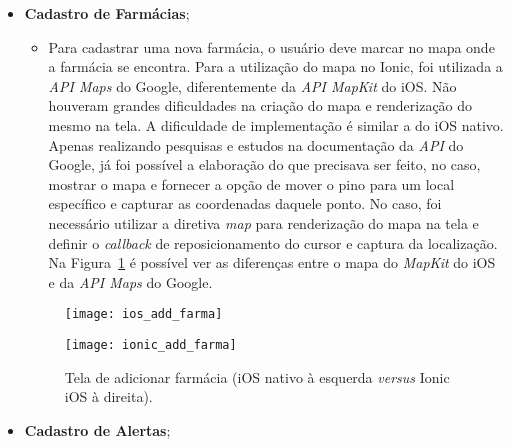 \begin{itemize}
\begin{itemize}
		 \end{itemize}
     \item \textbf{Cadastro de Farmácias}; 	
	 \begin{itemize}
		\item Para cadastrar uma nova farmácia, o usuário deve marcar no mapa onde a farmácia se encontra. Para a utilização do mapa no Ionic, foi utilizada a \textit{API Maps} do Google, diferentemente da 
		\textit{API MapKit} do iOS. Não houveram grandes dificuldades na criação do mapa e renderização do mesmo na tela. A dificuldade de implementação é similar a do iOS nativo.
		Apenas realizando pesquisas e estudos na documentação da \textit{API} do Google, 
		já foi possível a elaboração do que precisava ser feito, no caso, mostrar o mapa e fornecer a opção de mover o pino para um local específico e capturar as coordenadas daquele ponto. No caso, foi 
		necessário utilizar a diretiva \textit{map} para renderização do mapa na tela e definir o \textit{callback} de reposicionamento do cursor e captura da localização. Na Figura~\ref{fig:add_farma} é possível 
		ver as diferenças entre o mapa do \textit{MapKit} do iOS e da \textit{API Maps} do Google.
	 \end{itemize}
	 \begin{figure}[H]
		\centering
		\begin{minipage}{.5\textwidth}
			\centering
			\texttt{[image: ios\_add\_farma]}
		\end{minipage}\hfill
		\begin{minipage}{.5\textwidth}
			\centering
			\texttt{[image: ionic\_add\_farma]}
		\end{minipage}
	\caption[Tela de adicionar farmácia (iOS \textit{versus} Ionic)]{ Tela de adicionar farmácia (iOS nativo à esquerda \textit{versus} Ionic iOS à direita).}
	\label{fig:add_farma}
	\end{figure}
 	
 	\item \textbf{Cadastro de Alertas};
 	

\end{itemize}
